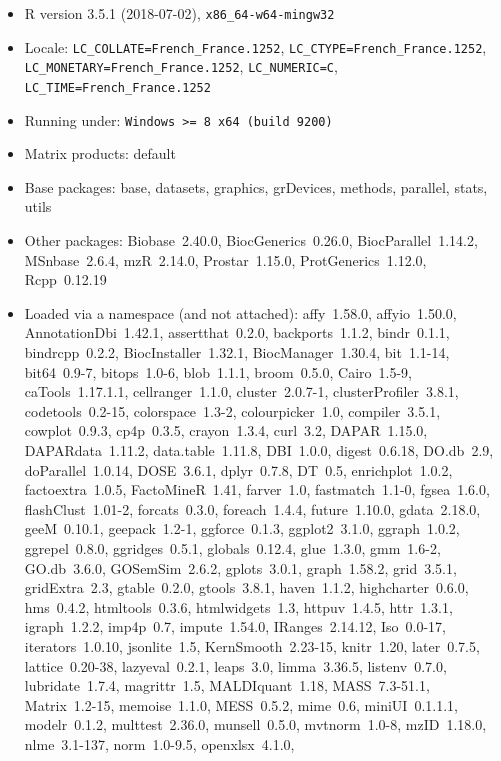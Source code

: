 \documentclass[12pt]{article}
\begin{document}
\begin{itemize}\raggedright
  \item R version 3.5.1 (2018-07-02), \verb|x86_64-w64-mingw32|
  \item Locale: \verb|LC_COLLATE=French_France.1252|, \verb|LC_CTYPE=French_France.1252|, \verb|LC_MONETARY=French_France.1252|, \verb|LC_NUMERIC=C|, \verb|LC_TIME=French_France.1252|
  \item Running under: \verb|Windows >= 8 x64 (build 9200)|
  \item Matrix products: default
  \item Base packages: base, datasets, graphics, grDevices, methods, parallel, stats, utils
  \item Other packages: Biobase~2.40.0, BiocGenerics~0.26.0, BiocParallel~1.14.2, MSnbase~2.6.4, mzR~2.14.0, Prostar~1.15.0,
    ProtGenerics~1.12.0, Rcpp~0.12.19
  \item Loaded via a namespace (and not attached): affy~1.58.0, affyio~1.50.0, AnnotationDbi~1.42.1, assertthat~0.2.0,
    backports~1.1.2, bindr~0.1.1, bindrcpp~0.2.2, BiocInstaller~1.32.1, BiocManager~1.30.4, bit~1.1-14, bit64~0.9-7,
    bitops~1.0-6, blob~1.1.1, broom~0.5.0, Cairo~1.5-9, caTools~1.17.1.1, cellranger~1.1.0, cluster~2.0.7-1,
    clusterProfiler~3.8.1, codetools~0.2-15, colorspace~1.3-2, colourpicker~1.0, compiler~3.5.1, cowplot~0.9.3, cp4p~0.3.5,
    crayon~1.3.4, curl~3.2, DAPAR~1.15.0, DAPARdata~1.11.2, data.table~1.11.8, DBI~1.0.0, digest~0.6.18, DO.db~2.9,
    doParallel~1.0.14, DOSE~3.6.1, dplyr~0.7.8, DT~0.5, enrichplot~1.0.2, factoextra~1.0.5, FactoMineR~1.41, farver~1.0,
    fastmatch~1.1-0, fgsea~1.6.0, flashClust~1.01-2, forcats~0.3.0, foreach~1.4.4, future~1.10.0, gdata~2.18.0, geeM~0.10.1,
    geepack~1.2-1, ggforce~0.1.3, ggplot2~3.1.0, ggraph~1.0.2, ggrepel~0.8.0, ggridges~0.5.1, globals~0.12.4, glue~1.3.0,
    gmm~1.6-2, GO.db~3.6.0, GOSemSim~2.6.2, gplots~3.0.1, graph~1.58.2, grid~3.5.1, gridExtra~2.3, gtable~0.2.0,
    gtools~3.8.1, haven~1.1.2, highcharter~0.6.0, hms~0.4.2, htmltools~0.3.6, htmlwidgets~1.3, httpuv~1.4.5, httr~1.3.1,
    igraph~1.2.2, imp4p~0.7, impute~1.54.0, IRanges~2.14.12, Iso~0.0-17, iterators~1.0.10, jsonlite~1.5, KernSmooth~2.23-15,
    knitr~1.20, later~0.7.5, lattice~0.20-38, lazyeval~0.2.1, leaps~3.0, limma~3.36.5, listenv~0.7.0, lubridate~1.7.4,
    magrittr~1.5, MALDIquant~1.18, MASS~7.3-51.1, Matrix~1.2-15, memoise~1.1.0, MESS~0.5.2, mime~0.6, miniUI~0.1.1.1,
    modelr~0.1.2, multtest~2.36.0, munsell~0.5.0, mvtnorm~1.0-8, mzID~1.18.0, nlme~3.1-137, norm~1.0-9.5, openxlsx~4.1.0,

\end{itemize}
\end{document}
